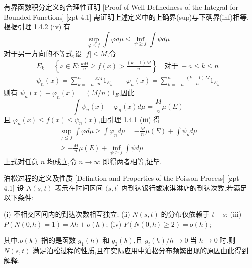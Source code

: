 \documentclass[UTF8]{ctexart}
\begin{document}
    
    
    \begin{prf}
        {有界函数积分定义的合理性证明}
        [Proof of Well-Definedness of the Integral for Bounded Functions]
        [gpt-4.1]
        需证明上述定义中的上确界(sup)与下确界(inf)相等.根据引理 1.4.2 (iv) 有
\[
\sup_{\varphi \leq f} \int \varphi d\mu \leq \inf_{\psi \geq f} \int \psi d\mu
\]
对于另一方向的不等式,设 $|f| \leq M$,令
\[
\begin{array}{l}
\displaystyle E_k = \left\{ x \in E : \frac{kM}{n} \geq f(x) > \frac{(k-1)M}{n} \right\} \quad \text{对于}~ -n \leq k \leq n \\
\displaystyle \psi_n(x) = \sum_{k=-n}^n \frac{kM}{n} 1_{E_k} \qquad \varphi_n(x) = \sum_{k=-n}^n \frac{(k-1)M}{n} 1_{E_k}
\end{array}
\]
则有 $\psi_n(x) - \varphi_n(x) = (M/n)1_E$,因此
\[
\int \psi_n(x) - \varphi_n(x) d\mu = \frac{M}{n} \mu(E)
\]
且 $\varphi_n(x) \leq f(x) \leq \psi_n(x)$,由引理 1.4.1 (iii) 得
\[
\begin{array}{c}
\operatorname*{sup}_{\varphi \leq f} \int \varphi d\mu \geq \int \varphi_n d\mu = -\frac{M}{n} \mu(E) + \int \psi_n d\mu \\
\geq -\frac{M}{n} \mu(E) + \operatorname*{inf}_{\psi \geq f} \int \psi d\mu
\end{array}
\]
上式对任意 $n$ 均成立,令 $n \to \infty$ 即得两者相等,证毕.

    \end{prf}
    
    
    
    \begin{thm}
        {泊松过程的定义及性质}
        [Definition and Properties of the Poisson Process]
        [gpt-4.1]
        设 $N(s, t)$ 表示在时间区间 $(s, t]$ 内到达银行或冰淇淋店的到达次数.若满足以下条件:

(i) 不相交区间内的到达次数相互独立;  
(ii) $N(s, t)$ 的分布仅依赖于 $t-s$;  
(iii) $P(N(0, h) = 1) = \lambda h + o(h)$;  
(iv) $P(N(0, h) \geq 2) = o(h)$;

其中,$o(h)$ 指的是函数 $g_{1}(h)$ 和 $g_{2}(h)$,且 $g_{i}(h)/h \to 0$ 当 $h \to 0$ 时.则 $N(s, t)$ 满足泊松过程的性质,且在实际应用中泊松分布频繁出现的原因由此得到解释.

    \end{thm}
    
    
    
\end{document}
